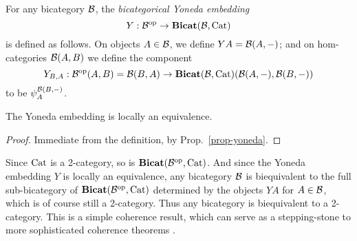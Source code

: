 \documentclass{robinthesisdraft}
\newcommand\defeqto{=}
\begin{document}
\begin{definition}
	For any bicategory $\mathcal{B}$, the \emph{bicategorical Yoneda embedding}
	\[
		Y: \mathcal{B}^\mathrm{op}\to\mathbf{Bicat}(\mathcal{B},\mathrm{Cat})
	\]
	is defined as follows.
	On objects $A\in\mathcal{B}$, we define $YA \defeqto \B(A,-)$; and
	on hom-categories $\mathcal{B}(A,B)$ we define the component
	\[
		Y_{B,A} : \mathcal{B}^\mathrm{op}(A,B) = \mathcal{B}(B,A) \to \mathbf{Bicat}(\mathcal{B},\mathrm{Cat})(\mathcal{B}(A,-), \mathcal{B}(B,-))
	\]
	to be $\psi^{\mathcal{B}(B,-)}_A$.
\end{definition}
\begin{corollary}
	The Yoneda embedding is locally an equivalence.
\end{corollary}
\begin{proof}
	Immediate from the definition, by Prop.~\ref{prop-yoneda}.
\end{proof}
\begin{remark}
	Since $\mathrm{Cat}$ is a 2-category, so is $\mathbf{Bicat}(\mathcal{B}^\mathrm{op},\mathrm{Cat})$.
	And since the Yoneda embedding $Y$ is locally an equivalence, any
	bicategory $\mathcal{B}$ is biequivalent to the full sub-bicategory of
	$\mathbf{Bicat}(\mathcal{B}^\mathrm{op},\mathrm{Cat})$ determined by the objects $YA$ for $A\in\mathcal{B}$, which
	is of course still a 2-category. Thus any bicategory is biequivalent
	to a 2-category. This is a simple coherence result, which can serve
	as a stepping-stone to more sophisticated coherence theorems
	\citep[Chapter~2]{GurskiThesis}.
\end{remark}
\end{document}
